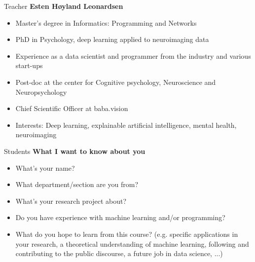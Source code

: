 \begin{frame}{Teacher}
    \textbf{Esten Høyland Leonardsen}
    \begin{itemize}
        \item Master's degree in Informatics: Programming and Networks
        \item PhD in Psychology, deep learning applied to neuroimaging data
        \item Experience as a data scientist and programmer from the industry and various start-ups
        \item Post-doc at the center for Cognitive psychology, Neuroscience and Neuropsychology
        \item Chief Scientific Officer at baba.vision
        \item Interests: Deep learning, explainable artificial intelligence, mental health, neuroimaging
    \end{itemize}
\end{frame}

\begin{frame}{Students}
    \textbf{What I want to know about you}
    \begin{itemize}
        \item What's your name?
        \item What department/section are you from?
        \item What's your research project about?
        \item Do you have experience with machine learning and/or programming?
        \item What do you hope to learn from this course? (e.g. specific applications in your research, a theoretical understanding of machine learning, following and contributing to the public discourse, a future job in data science, ...)
    \end{itemize}
\end{frame}

